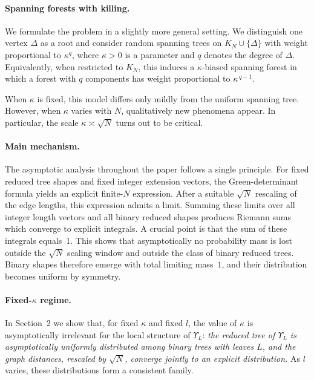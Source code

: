\documentclass[11pt]{article}
\begin{document}
\medskip
\paragraph{Spanning forests with killing.}
We formulate the problem in a slightly more general setting.
We distinguish one vertex $\Delta$ as a root and consider
random spanning trees on $K_N\cup\{\Delta\}$
with weight proportional to $\kappa^{q}$,
where $\kappa>0$ is a parameter and $q$
denotes the degree of $\Delta$.
Equivalently, when restricted to $K_N$,
this induces a $\kappa$-biased spanning forest
in which a forest with $q$ components has weight proportional to $\kappa^{\,q-1}$.

When $\kappa$ is fixed, this model differs only mildly
from the uniform spanning tree.
However, when $\kappa$ varies with $N$,
qualitatively new phenomena appear.
In particular, the scale $\kappa\asymp\sqrt N$
turns out to be critical.



\medskip
\paragraph{Main mechanism.}
The asymptotic analysis throughout the paper follows a single principle.
For fixed reduced tree shapes and fixed integer extension vectors,
the Green-determinant formula yields an explicit finite-\(N\) expression.
After a suitable $\sqrt N$ rescaling of the edge lengths,
this expression admits a limit.
Summing these limits over all integer length vectors
and all binary reduced shapes produces Riemann sums
which converge to explicit integrals.
A crucial point is that the sum of these integrals equals~$1$.
This shows that asymptotically no probability mass is lost
outside the $\sqrt N$ scaling window
and outside the class of binary reduced trees.
Binary shapes therefore emerge with total limiting mass~$1$,
and their distribution becomes uniform by symmetry.

\medskip
\paragraph{Fixed-$\kappa$ regime.}
In Section~2 we show that,
for fixed $\kappa$ and fixed $l$,
the value of $\kappa$ is asymptotically irrelevant
for the local structure of $\Upsilon_L$:
\emph{the reduced tree of $\Upsilon_L$ is asymptotically
uniformly distributed among binary trees with leaves $L$,
and the graph distances, rescaled by $\sqrt N$,
converge jointly to an explicit distribution.}
As $l$ varies, these distributions form a consistent family.
\end{document}
